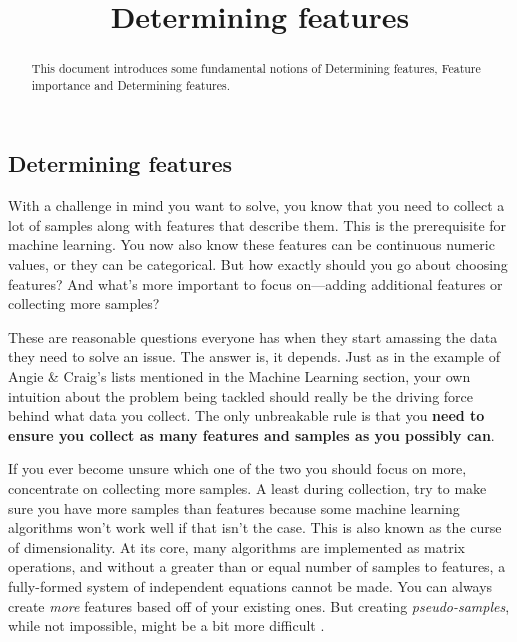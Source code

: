 \documentclass{article}
\begin{document}
\title{Determining features}

\maketitle

\begin{abstract}
This document introduces some fundamental notions of Determining features, Feature importance and Determining features.
\end{abstract}

\subsection{Determining features}
\par {} With a challenge in mind you want to solve, you know that you need to collect a lot of samples along with features that describe them. This is the prerequisite for machine learning. You now also know these features can be continuous numeric values, or they can be categorical. But how exactly should you go about choosing features? And what's more important to focus on—adding additional features or collecting more samples?

\par {}These are reasonable questions everyone has when they start amassing the data they need to solve an issue. The answer is, it depends. Just as in the example of Angie \& Craig's lists mentioned in the Machine Learning section, your own intuition about the problem being tackled should really be the driving force behind what data you collect. The only unbreakable rule is that you {\bf{need to ensure you collect as many features and samples as you possibly can}}.

\par If you ever become unsure which one of the two you should focus on more, concentrate on collecting more samples. A least during collection, try to make sure you have more samples than features because some machine learning algorithms won't work well if that isn't the case. This is also known as the curse of dimensionality. At its core, many algorithms are implemented as matrix operations, and without a greater than or equal number of samples to features, a fully-formed system of independent equations cannot be made. You can always create {\it{more}} features based off of your existing ones. But creating {\it{pseudo-samples}}, while not impossible, might be a bit more difficult .
\end{document}

